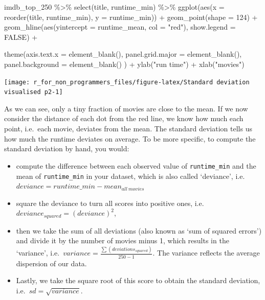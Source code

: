 \documentclass[
]{book}
\newenvironment{Shaded}{\begin{snugshade}}{\end{snugshade}}
\newcommand{\AttributeTok}[1]{\textcolor[rgb]{0.77,0.63,0.00}{#1}}
\newcommand{\ConstantTok}[1]{\textcolor[rgb]{0.00,0.00,0.00}{#1}}
\newcommand{\DecValTok}[1]{\textcolor[rgb]{0.00,0.00,0.81}{#1}}
\newcommand{\FunctionTok}[1]{\textcolor[rgb]{0.00,0.00,0.00}{#1}}
\newcommand{\NormalTok}[1]{#1}
\newcommand{\SpecialCharTok}[1]{\textcolor[rgb]{0.00,0.00,0.00}{#1}}
\newcommand{\StringTok}[1]{\textcolor[rgb]{0.31,0.60,0.02}{#1}}
\begin{document}
\begin{Shaded}
\begin{Highlighting}[]
\NormalTok{imdb\_top\_250 }\SpecialCharTok{\%\textgreater{}\%}
  \FunctionTok{select}\NormalTok{(title, runtime\_min) }\SpecialCharTok{\%\textgreater{}\%}
  \FunctionTok{ggplot}\NormalTok{(}\FunctionTok{aes}\NormalTok{(}\AttributeTok{x =} \FunctionTok{reorder}\NormalTok{(title, runtime\_min), }\AttributeTok{y =}\NormalTok{ runtime\_min)) }\SpecialCharTok{+}
  \FunctionTok{geom\_point}\NormalTok{(}\AttributeTok{shape =} \DecValTok{124}\NormalTok{) }\SpecialCharTok{+}
  \FunctionTok{geom\_hline}\NormalTok{(}\FunctionTok{aes}\NormalTok{(}\AttributeTok{yintercept =}\NormalTok{ runtime\_mean, }\AttributeTok{col =} \StringTok{"red"}\NormalTok{), }\AttributeTok{show.legend =} \ConstantTok{FALSE}\NormalTok{) }\SpecialCharTok{+}

  \FunctionTok{theme}\NormalTok{(}\AttributeTok{axis.text.x =} \FunctionTok{element\_blank}\NormalTok{(),}
        \AttributeTok{panel.grid.major =} \FunctionTok{element\_blank}\NormalTok{(),}
        \AttributeTok{panel.background =} \FunctionTok{element\_blank}\NormalTok{()}
\NormalTok{        ) }\SpecialCharTok{+}
  \FunctionTok{ylab}\NormalTok{(}\StringTok{"run time"}\NormalTok{) }\SpecialCharTok{+}
  \FunctionTok{xlab}\NormalTok{(}\StringTok{"movies"}\NormalTok{)}
\end{Highlighting}
\end{Shaded}

\begin{center}\texttt{[image: r\_for\_non\_programmers\_files/figure-latex/Standard deviation visualised p2-1]} \end{center}

As we can see, only a tiny fraction of movies are close to the mean. If we now consider the distance of each dot from the red line, we know how much each point, i.e.~each movie, deviates from the mean. The standard deviation tells us how much the runtime deviates on average. To be more specific, to compute the standard deviation by hand, you would:

\begin{itemize}
\item
  compute the difference between each observed value of \texttt{runtime\_min} and the mean of \texttt{runtime\_min} in your dataset, which is also called `deviance', i.e.~\(deviance = runtime\_min - mean_{all\ movies}\)
\item
  square the deviance to turn all scores into positive ones, i.e.~\(deviance_{squared} = (deviance)^2\),
\item
  then we take the sum of all deviations (also known as `sum of squared errors') and divide it by the number of movies minus 1, which results in the `variance', i.e.~\(variance = \frac{\sum(deviations_{squared})}{250-1}\). The variance reflects the average dispersion of our data.
\item
  Lastly, we take the square root of this score to obtain the standard deviation, i.e.~\(sd = \sqrt{variance}\).
\end{itemize}
\end{document}
